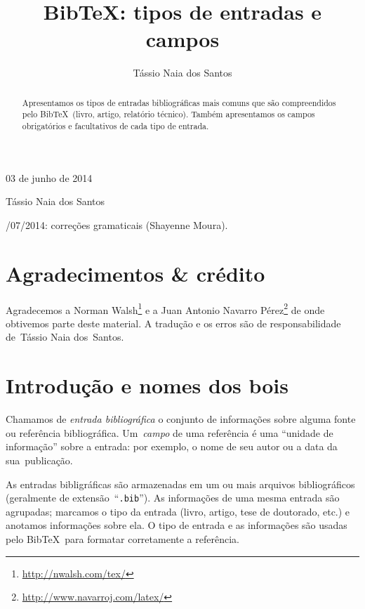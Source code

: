 \documentclass[article,openany]{memoir}
\title{Bib\TeX: tipos de entradas e campos}
\author{Tássio Naia dos Santos}
\begin{document}



\hfill 03 de junho de 2014

\medskip

\noindent Tássio Naia dos Santos

\medskip

/07/2014: correções gramaticais (Shayenne Moura).

\bigskip

\begin{abstract}
Apresentamos os tipos de entradas bibliográficas mais comuns
que são compreendidos pelo Bib\TeX\ (livro, artigo, relatório
técnico). Também apresentamos os campos obrigatórios e facultativos de
cada tipo de entrada.
\end{abstract}


\chapter*{Agradecimentos \& crédito}

Agradecemos a Norman Walsh\footnote{\url{http://nwalsh.com/tex/}} e a
Juan Antonio Navarro
Pérez\footnote{\url{http://www.navarroj.com/latex/}} de onde obtivemos
parte deste material. A tradução e os erros são de responsabilidade
de~Tássio Naia dos~Santos.

\chapter{Introdução e nomes dos bois}

Chamamos de \emph{entrada bibliográfica} o conjunto de informações
sobre alguma fonte ou referência bibliográfica. Um~\emph{campo} de uma
referência é uma ``unidade de informação'' sobre a entrada: por
exemplo, o nome de seu autor ou a data da sua~publicação.

As entradas bibligráficas são armazenadas em um ou mais arquivos
bibliográficos (geralmente de extensão~``\texttt{.bib}''). As
informações de uma mesma entrada são agrupadas; marcamos o tipo da entrada
(livro, artigo, tese de doutorado, etc.) e anotamos informações sobre
ela. O tipo de entrada e as informações são usadas pelo
Bib\TeX\ para formatar corretamente a referência.
\end{document}

